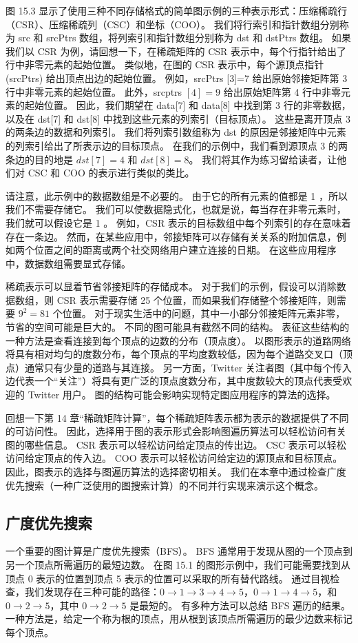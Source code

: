图 15.3 显示了使用三种不同存储格式的简单图示例的三种表示形式：压缩稀疏行（CSR）、压缩稀疏列（CSC）和坐标（COO）。 我们将行索引和指针数组分别称为 src 和 srcPtrs 数组，将列索引和指针数组分别称为 dst 和 dstPtrs 数组。 如果我们以 CSR 为例，请回想一下，在稀疏矩阵的 CSR 表示中，每个行指针给出了行中非零元素的起始位置。 类似地，在图的 CSR 表示中，每个源顶点指针 (srcPtrs) 给出顶点出边的起始位置。 例如，srcPtrs [3]=7 给出原始邻接矩阵第 3 行中非零元素的起始位置。 此外，srcptrs $[4]=9$ 给出原始矩阵第 4 行中非零元素的起始位置。 因此，我们期望在 data[7] 和 data[8] 中找到第 3 行的非零数据，以及在 dst[7] 和 dst[8] 中找到这些元素的列索引（目标顶点）。 这些是离开顶点 3 的两条边的数据和列索引。 我们将列索引数组称为 dst 的原因是邻接矩阵中元素的列索引给出了所表示边的目标顶点。 在我们的示例中，我们看到源顶点 3 的两条边的目的地是 $d s t[7]=4$ 和 $d s t[8]=8$。 我们将其作为练习留给读者，让他们对 CSC 和 COO 的表示进行类似的类比。

请注意，此示例中的数据数组是不必要的。 由于它的所有元素的值都是 1 ，所以我们不需要存储它。 我们可以使数据隐式化，也就是说，每当存在非零元素时，我们就可以假设它是 1 。 例如，CSR 表示的目标数组中每个列索引的存在意味着存在一条边。 然而，在某些应用中，邻接矩阵可以存储有关关系的附加信息，例如两个位置之间的距离或两个社交网络用户建立连接的日期。 在这些应用程序中，数据数组需要显式存储。

稀疏表示可以显着节省邻接矩阵的存储成本。 对于我们的示例，假设可以消除数据数组，则 CSR 表示需要存储 25 个位置，而如果我们存储整个邻接矩阵，则需要 $9^{2}=81$ 个位置。 对于现实生活中的问题，其中一小部分邻接矩阵元素非零，节省的空间可能是巨大的。 不同的图可能具有截然不同的结构。 表征这些结构的一种方法是查看连接到每个顶点的边数的分布（顶点度）。 以图形表示的道路网络将具有相对均匀的度数分布，每个顶点的平均度数较低，因为每个道路交叉口（顶点）通常只有少量的道路与其连接。 另一方面，Twitter 关注者图（其中每个传入边代表一个“关注”）将具有更广泛的顶点度数分布，其中度数较大的顶点代表受欢迎的 Twitter 用户。 图的结构可能会影响实现特定图应用程序的算法的选择。

回想一下第 14 章“稀疏矩阵计算”，每个稀疏矩阵表示都为表示的数据提供了不同的可访问性。 因此，选择用于图的表示形式会影响图遍历算法可以轻松访问有关图的哪些信息。 CSR 表示可以轻松访问给定顶点的传出边。 CSC 表示可以轻松访问给定顶点的传入边。 $\mathrm{COO}$ 表示可以轻松访问给定边的源顶点和目标顶点。 因此，图表示的选择与图遍历算法的选择密切相关。 我们在本章中通过检查广度优先搜索（一种广泛使用的图搜索计算）的不同并行实现来演示这个概念。

\subsection{广度优先搜索}
一个重要的图计算是广度优先搜索（BFS）。 BFS 通常用于发现从图的一个顶点到另一个顶点所需遍历的最短边数。 在图 15.1 的图形示例中，我们可能需要找到从顶点 0 表示的位置到顶点 5 表示的位置可以采取的所有替代路线。 通过目视检查，我们发现存在三种可能的路径：$0 \rightarrow 1 \rightarrow 3 \rightarrow 4 \rightarrow 5，0 \rightarrow 1 \rightarrow 4 \rightarrow 5$，和 $0 \rightarrow 2 \rightarrow 5$，其中 $0 \rightarrow 2 \rightarrow 5$ 是最短的。 有多种方法可以总结 BFS 遍历的结果。 一种方法是，给定一个称为根的顶点，用从根到该顶点所需遍历的最少边数来标记每个顶点。

